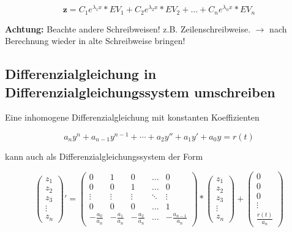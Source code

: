 \documentclass[12pt, a4paper]{scrreprt}
\begin{document}
\[
  \mathbf{z} = C_1 e^{\lambda_1 x}*EV_1 + C_2 e^{\lambda_2 x}*EV_2 + \dots + C_n e^{\lambda_n x}*EV_n
\]

\textbf{Achtung:} Beachte andere Schreibweisen! z.B. Zeilenschreibweise. $\rightarrow$ nach Berechnung wieder in alte Schreibweise bringen!

\subsection{Differenzialgleichung in Differenzialgleichungssystem umschreiben}

Eine inhomogene Differenzialgleichung mit konstanten Koeffizienten

\[
  a_ny^{n} + a_{n-1}y^{n-1} + \cdots + a_2y'' + a_1y' + a_0y = r(t)
\]

kann auch als Differenzialgleichungssystem der Form

\[
  \begin{pmatrix}
    z_1\\
    z_2\\
    z_3\\
    \vdots\\
    z_n
  \end{pmatrix} ' =
  \begin{pmatrix}
    0 & 1 & 0 & \dots & 0\\
    0 & 0 & 1 & \dots & 0\\
    \vdots & \vdots & \vdots & \ddots & \vdots\\
    0 & 0 & 0 & \dots & 1\\
    - \frac{a_0}{a_n} & - \frac{a_1}{a_n} & - \frac{a_2}{a_n} & \dots & - \frac{a_{n-1}}{a_n}
  \end{pmatrix} *
  \begin{pmatrix}
    z_1\\
    z_2\\
    z_3\\
    \vdots\\
    z_n
  \end{pmatrix} +
  \begin{pmatrix}
    0\\
    0\\
    0\\
    \vdots\\
    \frac{r(t)}{a_n}
  \end{pmatrix}
\]
\end{document}
